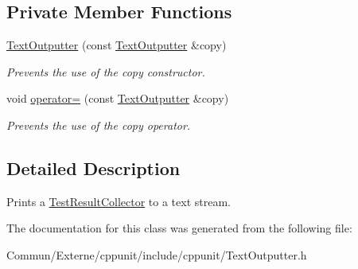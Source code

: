 \subsection*{Private Member Functions}
\begin{DoxyCompactItemize}
\item 
\hyperlink{class_text_outputter_a714bc90785e3626f7f7b6fd8aa99fb8e}{Text\+Outputter} (const \hyperlink{class_text_outputter}{Text\+Outputter} \&copy)\hypertarget{class_text_outputter_a714bc90785e3626f7f7b6fd8aa99fb8e}{}\label{class_text_outputter_a714bc90785e3626f7f7b6fd8aa99fb8e}

\begin{DoxyCompactList}\small\item\em Prevents the use of the copy constructor. \end{DoxyCompactList}\item 
void \hyperlink{class_text_outputter_af10e29800e5e2aee45697bab6ca52f66}{operator=} (const \hyperlink{class_text_outputter}{Text\+Outputter} \&copy)\hypertarget{class_text_outputter_af10e29800e5e2aee45697bab6ca52f66}{}\label{class_text_outputter_af10e29800e5e2aee45697bab6ca52f66}

\begin{DoxyCompactList}\small\item\em Prevents the use of the copy operator. \end{DoxyCompactList}\end{DoxyCompactItemize}


\subsection{Detailed Description}
Prints a \hyperlink{class_test_result_collector}{Test\+Result\+Collector} to a text stream. 

The documentation for this class was generated from the following file\+:\begin{DoxyCompactItemize}
\item 
Commun/\+Externe/cppunit/include/cppunit/Text\+Outputter.\+h\end{DoxyCompactItemize}
